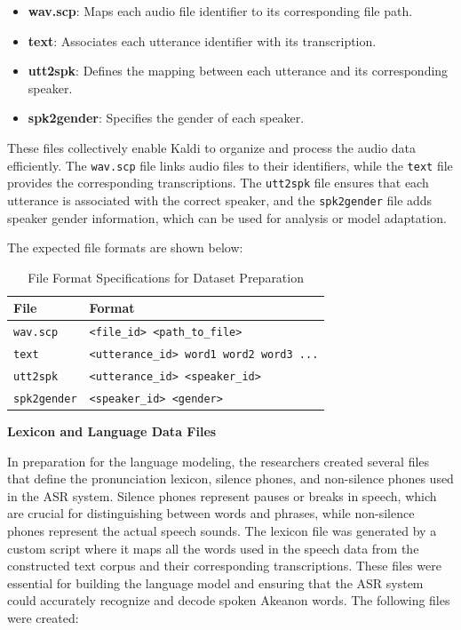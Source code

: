 \begin{itemize}
       \item \textbf{wav.scp}: Maps each audio file identifier to its corresponding file path.
       \item \textbf{text}: Associates each utterance identifier with its transcription.
       \item \textbf{utt2spk}: Defines the mapping between each utterance and its corresponding speaker.
       \item \textbf{spk2gender}: Specifies the gender of each speaker.
\end{itemize}

These files collectively enable Kaldi to organize and process the audio data efficiently. The \texttt{wav.scp} file links audio files to their identifiers, while the \texttt{text} file provides the corresponding transcriptions. The \texttt{utt2spk} file ensures that each utterance is associated with the correct speaker, and the \texttt{spk2gender} file adds speaker gender information, which can be used for analysis or model adaptation.

The expected file formats are shown below:

\begin{table}[H]
\centering
\renewcommand{\arraystretch}{1.3}
\setlength{\tabcolsep}{10pt}
\caption{File Format Specifications for Dataset Preparation}
\label{tab:fileformats}
\begin{tabular}{|l|l|}
\hline
\textbf{File} & \textbf{Format} \\
\hline
\texttt{wav.scp} & \texttt{<file\_id> <path\_to\_file>} \\
\texttt{text} & \texttt{<utterance\_id> word1 word2 word3 ...} \\
\texttt{utt2spk} & \texttt{<utterance\_id> <speaker\_id>} \\
\texttt{spk2gender} & \texttt{<speaker\_id> <gender>} \\
\hline
\end{tabular}
\end{table}

\textbf{Lexicon and Language Data Files}

In preparation for the language modeling, the researchers created several files that define the pronunciation lexicon, silence phones, and non-silence phones used in the ASR system. Silence phones represent pauses or breaks in speech, which are crucial for distinguishing between words and phrases, while non-silence phones represent the actual speech sounds. The lexicon file was generated by a custom script where it maps all the words used in the speech data from the constructed text corpus and their corresponding transcriptions. These files were essential for building the language model and ensuring that the ASR system could accurately recognize and decode spoken Akeanon words. The following files were created:

